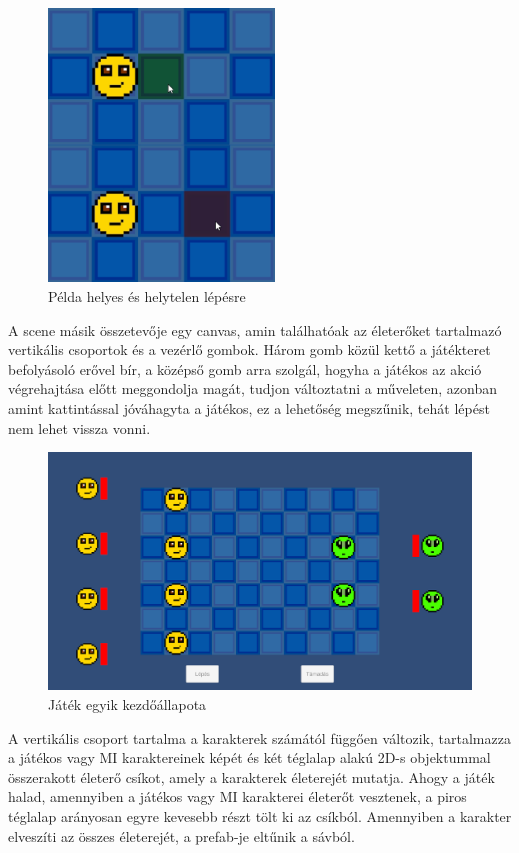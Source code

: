\documentclass[
]{thesis-ekf}
\theoremstyle{definition}
\theoremstyle{remark}
\begin{document}
\begin{figure}[h!]
	\centering
	\includegraphics[width=6cm]{./pictures/game_move_tile.png}
	\caption{Példa helyes és helytelen lépésre}
	\label{gamemove}
\end{figure}

A scene másik összetevője egy canvas, amin találhatóak az életerőket tartalmazó vertikális csoportok és a vezérlő gombok. Három gomb közül kettő a játékteret befolyásoló erővel bír, a középső gomb arra szolgál, hogyha a játékos az akció végrehajtása előtt meggondolja magát, tudjon változtatni a műveleten, azonban amint kattintással jóváhagyta a játékos, ez a lehetőség megszűnik, tehát lépést nem lehet vissza vonni.

\begin{figure}[h!]
	\centering
	\includegraphics[width=14cm]{./pictures/game_health_ui.png}
	\caption{Játék egyik kezdőállapota}
	\label{game}
\end{figure}

A vertikális csoport tartalma a karakterek számától függően változik, tartalmazza a játékos vagy MI karaktereinek képét és két téglalap alakú 2D-s objektummal összerakott életerő csíkot, amely a karakterek életerejét mutatja. Ahogy a játék halad, amennyiben a játékos vagy MI karakterei életerőt vesztenek, a piros téglalap arányosan egyre kevesebb részt tölt ki az csíkból. Amennyiben a karakter elveszíti az összes életerejét, a prefab-je eltűnik a sávból.
\end{document}
